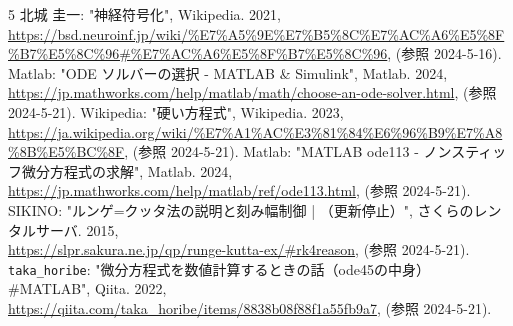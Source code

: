 \documentclass[10pt]{jarticle}
\begin{document}
\begin{thebibliography}{5}
		北城 圭一: "神経符号化", Wikipedia. 2021, \\
    \url{https://bsd.neuroinf.jp/wiki/%E7%A5%9E%E7%B5%8C%E7%AC%A6%E5%8F%B7%E5%8C%96#%E7%AC%A6%E5%8F%B7%E5%8C%96}, (参照 2024-5-16).
		Matlab: "ODE ソルバーの選択 - MATLAB \& Simulink", Matlab. 2024, \\
    \url{https://jp.mathworks.com/help/matlab/math/choose-an-ode-solver.html}, (参照 2024-5-21).
		Wikipedia: "硬い方程式", Wikipedia. 2023, \\
    \url{https://ja.wikipedia.org/wiki/%E7%A1%AC%E3%81%84%E6%96%B9%E7%A8%8B%E5%BC%8F}, (参照 2024-5-21).
		Matlab: "MATLAB ode113 - ノンスティッフ微分方程式の求解", Matlab. 2024, \\
    \url{https://jp.mathworks.com/help/matlab/ref/ode113.html}, (参照 2024-5-21).
		SIKINO: "ルンゲ=クッタ法の説明と刻み幅制御 | （更新停止）", さくらのレンタルサーバ. 2015, \\
    \url{https://slpr.sakura.ne.jp/qp/runge-kutta-ex/#rk4reason}, (参照 2024-5-21).
		\verb|taka_horibe|: "微分方程式を数値計算するときの話（ode45の中身） #MATLAB", Qiita. 2022, \\
    \url{https://qiita.com/taka_horibe/items/8838b08f88f1a55fb9a7}, (参照 2024-5-21).
\end{thebibliography}
\end{document}
